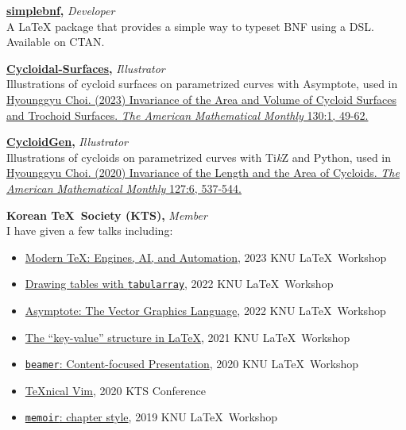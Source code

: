 \documentclass[a4paper,10pt,oneside]{memoir}
\begin{document}
\textbf{\textsf{\href{https://ctan.org/pkg/simplebnf}{simplebnf},}} \textit{Developer}\\
A \LaTeX{} package that provides a simple way to typeset BNF using a DSL. Available on CTAN.
\vspace{0.5\onelineskip}

\textbf{\textsf{\href{https://github.com/Zeta611/cycloidal-surfaces}{Cycloidal-Surfaces},}} \textit{Illustrator}\\
Illustrations of cycloid surfaces on parametrized curves with Asymptote, used in \href{https://doi.org/10.1080/00029890.2022.2130677}{Hyounggyu Choi. (2023) Invariance of the Area and Volume of Cycloid Surfaces and Trochoid Surfaces. \textit{The American Mathematical Monthly} 130:1, 49-62.}
\vspace{0.5\onelineskip}

\textbf{\textsf{\href{https://github.com/Zeta611/cycloidgen}{CycloidGen},}} \textit{Illustrator}\\
Illustrations of cycloids on parametrized curves with Ti\textit{k}Z and Python, used in \href{https://doi.org/10.1080/00029890.2020.1743611}{Hyounggyu Choi. (2020) Invariance of the Length and the Area of Cycloids. \textit{The American Mathematical Monthly} 127:6, 537-544.}
\vspace{0.5\onelineskip}

\textbf{\textsf{Korean \TeX\ Society (KTS),}} \textit{Member}\\
I have given a few talks including:
\begin{itemize}[noitemsep]
  \item \href{https://githubcom/Zeta611/modern-tex-engines-automation-ai-latex-workshop-2023}{Modern \TeX: Engines, AI, and Automation}, 2023 KNU \LaTeX\ Workshop
  \item \href{https://github.com/Zeta611/tabularray-tutorial-latex-workshop-2022}{Drawing tables with \texttt{tabularray}}, 2022 KNU \LaTeX\ Workshop
  \item \href{https://github.com/Zeta611/asymptote-tutorial-latex-workshop-2021}{Asymptote: The Vector Graphics Language}, 2022 KNU \LaTeX\ Workshop
  \item \href{https://github.com/Zeta611/key-value-tutorial-latex-workshop-2021}{The ``key-value'' structure in \LaTeX}, 2021 KNU \LaTeX\ Workshop
  \item \href{https://github.com/Zeta611/beamer-tutorial-latex-workshop-2020}{\texttt{beamer}: Content-focused Presentation}, 2020 KNU \LaTeX\ Workshop
  \item \href{https://github.com/Zeta611/texnical-vim-kts-conf-2020}{\TeX{}nical Vim}, 2020 KTS Conference
  \item \href{https://github.com/Zeta611/chapterstyle-latex-workshop-2019}{\texttt{memoir}: chapter style}, 2019 KNU \LaTeX\ Workshop
\end{itemize}
\vspace{0.5\onelineskip}
\end{document}
